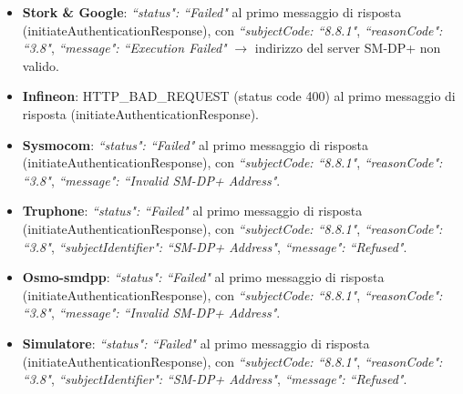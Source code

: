 \documentclass[10pt, oneside]{book}
\begin{document}
\begin{itemize}
\item \textbf{Stork \& Google}: \textit{``status": ``Failed"} al primo messaggio di risposta (initiateAuthenticationResponse), con \textit{``subjectCode: ``8.8.1"}, \textit{``reasonCode": ``3.8"}, \textit{``message": ``Execution Failed"} $\rightarrow$ indirizzo del server SM-DP+ non valido.
\item \textbf{Infineon}: HTTP\_BAD\_REQUEST (status code 400) al primo messaggio di risposta (initiateAuthenticationResponse).
\item \textbf{Sysmocom}:  \textit{``status": ``Failed"} al primo messaggio di risposta (initiateAuthenticationResponse), con \textit{``subjectCode: ``8.8.1"}, \textit{``reasonCode": ``3.8"}, \textit{``message": ``Invalid SM-DP+ Address"}.
\item \textbf{Truphone}: \textit{``status": ``Failed"} al primo messaggio di risposta (initiateAuthenticationResponse), con \textit{``subjectCode: ``8.8.1"}, \textit{``reasonCode": ``3.8"}, \textit{``subjectIdentifier": ``SM-DP+ Address"}, \textit{``message": ``Refused"}.
\item \textbf{Osmo-smdpp}: \textit{``status": ``Failed"} al primo messaggio di risposta (initiateAuthenticationResponse), con \textit{``subjectCode: ``8.8.1"}, \textit{``reasonCode": ``3.8"}, \textit{``message": ``Invalid SM-DP+ Address"}.
\item \textbf{Simulatore}: \textit{``status": ``Failed"} al primo messaggio di risposta (initiateAuthenticationResponse), con \textit{``subjectCode: ``8.8.1"}, \textit{``reasonCode": ``3.8"}, \textit{``subjectIdentifier": ``SM-DP+ Address"}, \textit{``message": ``Refused"}.
\end{itemize}
\end{document}
